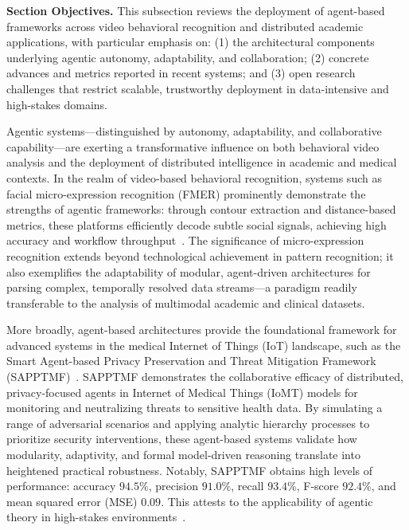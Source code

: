 \documentclass[sigconf]{acmart}
\begin{document}
\textbf{Section Objectives.} This subsection reviews the deployment of agent-based frameworks across video behavioral recognition and distributed academic applications, with particular emphasis on: (1) the architectural components underlying agentic autonomy, adaptability, and collaboration; (2) concrete advances and metrics reported in recent systems; and (3) open research challenges that restrict scalable, trustworthy deployment in data-intensive and high-stakes domains.

Agentic systems—distinguished by autonomy, adaptability, and collaborative capability—are exerting a transformative influence on both behavioral video analysis and the deployment of distributed intelligence in academic and medical contexts. In the realm of video-based behavioral recognition, systems such as facial micro-expression recognition (FMER) prominently demonstrate the strengths of agentic frameworks: through contour extraction and distance-based metrics, these platforms efficiently decode subtle social signals, achieving high accuracy and workflow throughput~\cite{ref116}. The significance of micro-expression recognition extends beyond technological achievement in pattern recognition; it also exemplifies the adaptability of modular, agent-driven architectures for parsing complex, temporally resolved data streams—a paradigm readily transferable to the analysis of multimodal academic and clinical datasets.

More broadly, agent-based architectures provide the foundational framework for advanced systems in the medical Internet of Things (IoT) landscape, such as the Smart Agent-based Privacy Preservation and Threat Mitigation Framework (SAPPTMF)~\cite{ref19}. SAPPTMF demonstrates the collaborative efficacy of distributed, privacy-focused agents in Internet of Medical Things (IoMT) models for monitoring and neutralizing threats to sensitive health data. By simulating a range of adversarial scenarios and applying analytic hierarchy processes to prioritize security interventions, these agent-based systems validate how modularity, adaptivity, and formal model-driven reasoning translate into heightened practical robustness. Notably, SAPPTMF obtains high levels of performance: accuracy $94.5\%$, precision $91.0\%$, recall $93.4\%$, F-score $92.4\%$, and mean squared error (MSE) $0.09$. This attests to the applicability of agentic theory in high-stakes environments~\cite{ref19}.
\end{document}
